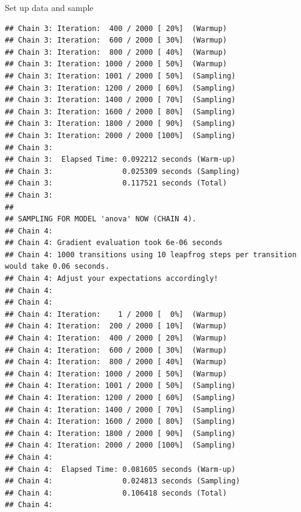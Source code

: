 \documentclass[
  ignorenonframetext,
]{beamer}
\begin{document}
\begin{frame}[fragile]{Set up data and sample}
\begin{verbatim}
## Chain 3: Iteration:  400 / 2000 [ 20%]  (Warmup)
## Chain 3: Iteration:  600 / 2000 [ 30%]  (Warmup)
## Chain 3: Iteration:  800 / 2000 [ 40%]  (Warmup)
## Chain 3: Iteration: 1000 / 2000 [ 50%]  (Warmup)
## Chain 3: Iteration: 1001 / 2000 [ 50%]  (Sampling)
## Chain 3: Iteration: 1200 / 2000 [ 60%]  (Sampling)
## Chain 3: Iteration: 1400 / 2000 [ 70%]  (Sampling)
## Chain 3: Iteration: 1600 / 2000 [ 80%]  (Sampling)
## Chain 3: Iteration: 1800 / 2000 [ 90%]  (Sampling)
## Chain 3: Iteration: 2000 / 2000 [100%]  (Sampling)
## Chain 3: 
## Chain 3:  Elapsed Time: 0.092212 seconds (Warm-up)
## Chain 3:                0.025309 seconds (Sampling)
## Chain 3:                0.117521 seconds (Total)
## Chain 3: 
## 
## SAMPLING FOR MODEL 'anova' NOW (CHAIN 4).
## Chain 4: 
## Chain 4: Gradient evaluation took 6e-06 seconds
## Chain 4: 1000 transitions using 10 leapfrog steps per transition would take 0.06 seconds.
## Chain 4: Adjust your expectations accordingly!
## Chain 4: 
## Chain 4: 
## Chain 4: Iteration:    1 / 2000 [  0%]  (Warmup)
## Chain 4: Iteration:  200 / 2000 [ 10%]  (Warmup)
## Chain 4: Iteration:  400 / 2000 [ 20%]  (Warmup)
## Chain 4: Iteration:  600 / 2000 [ 30%]  (Warmup)
## Chain 4: Iteration:  800 / 2000 [ 40%]  (Warmup)
## Chain 4: Iteration: 1000 / 2000 [ 50%]  (Warmup)
## Chain 4: Iteration: 1001 / 2000 [ 50%]  (Sampling)
## Chain 4: Iteration: 1200 / 2000 [ 60%]  (Sampling)
## Chain 4: Iteration: 1400 / 2000 [ 70%]  (Sampling)
## Chain 4: Iteration: 1600 / 2000 [ 80%]  (Sampling)
## Chain 4: Iteration: 1800 / 2000 [ 90%]  (Sampling)
## Chain 4: Iteration: 2000 / 2000 [100%]  (Sampling)
## Chain 4: 
## Chain 4:  Elapsed Time: 0.081605 seconds (Warm-up)
## Chain 4:                0.024813 seconds (Sampling)
## Chain 4:                0.106418 seconds (Total)
## Chain 4:
\end{verbatim}

\end{frame}
\end{document}
